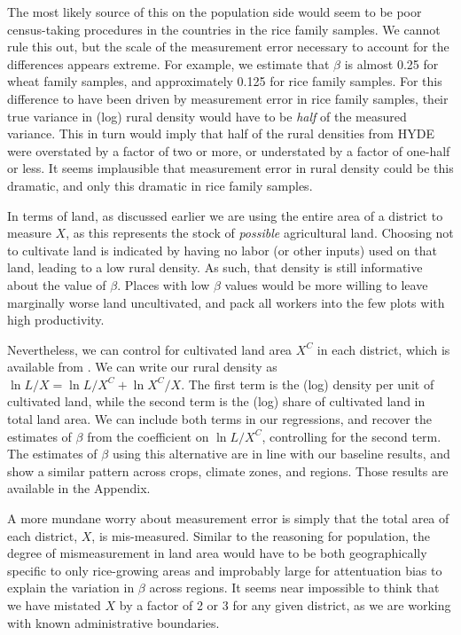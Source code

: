 \documentclass[11pt]{article}
\begin{document}
The most likely source of this on the population side would seem to be poor census-taking procedures in the countries in the rice family samples. We cannot rule this out, but the scale of the measurement error necessary to account for the differences appears extreme. For example, we estimate that $\beta$ is almost 0.25 for wheat family samples, and approximately 0.125 for rice family samples. For this difference to have been driven by measurement error in rice family samples, their true variance in (log) rural density would have to be \textit{half} of the measured variance. This in turn would imply that half of the rural densities from HYDE were overstated by a factor of two or more, or understated by a factor of one-half or less. It seems implausible that measurement error in rural density could be this dramatic, and only this dramatic in rice family samples.

In terms of land, as discussed earlier we are using the entire area of a district to measure $X$, as this represents the stock of \textit{possible} agricultural land. Choosing not to cultivate land is indicated by having no labor (or other inputs) used on that land, leading to a low rural density. As such, that density is still informative about the value of $\beta$. Places with low $\beta$ values would be more willing to leave marginally worse land uncultivated, and pack all workers into the few plots with high productivity. 

Nevertheless, we can control for cultivated land area $X^C$ in each district, which is available from \cite{gaez}. We can write our rural density as $\ln L/X = \ln L/X^C + \ln X^C/X$. The first term is the (log) density per unit of cultivated land, while the second term is the (log) share of cultivated land in total land area. We can include both terms in our regressions, and recover the estimates of $\beta$ from the coefficient on $\ln L/X^C$, controlling for the second term. The estimates of $\beta$ using this alternative are in line with our baseline results, and show a similar pattern across crops, climate zones, and regions. Those results are available in the Appendix.

A more mundane worry about measurement error is simply that the total area of each district, $X$, is mis-measured. Similar to the reasoning for population, the degree of mismeasurement in land area would have to be both geographically specific to only rice-growing areas and improbably large for attentuation bias to explain the variation in $\beta$ across regions. It seems near impossible to think that we have mistated $X$ by a factor of 2 or 3 for any given district, as we are working with known administrative boundaries.
\end{document}
